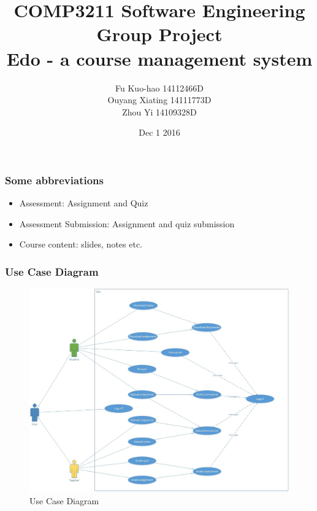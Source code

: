\documentclass{beamer}
\title[SE Project]{COMP3211 Software Engineering \\
                        Group Project \\
                        Edo - a course management system} %
\author{Fu Kuo-hao 14112466D \\
        Ouyang Xiating 14111773D \\
        Zhou Yi 14109328D} %
\institute %
{
Department of Computing
}
\date{Dec 1 2016} %
\begin{document}
\begin{frame}
\titlepage %
\end{frame}

\begin{frame}
\frametitle{Some abbreviations} %
\begin{itemize}
	\item Assessment: Assignment and Quiz
	\item Assessment Submission: Assignment and quiz submission
	\item Course content: slides, notes etc.
\end{itemize}
\end{frame}


\begin{frame}
\frametitle{Use Case Diagram}
\begin{figure}[!ht]
	\begin{center}
		\includegraphics[width=\textwidth,height=0.7\textheight,keepaspectratio]{usecase}
	\end{center}
	\caption{Use Case Diagram}
\end{figure}
\end{frame}
\end{document}

